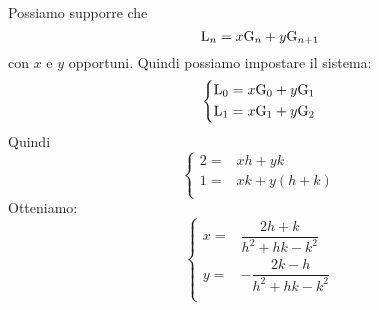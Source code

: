 Possiamo supporre che \begin{equation*}
	\mathrm{L}_{n}=x\mathrm{G}_{n}+y\mathrm{G}_{n+1}
\end{equation*}
con $x$ e $y$ opportuni. Quindi possiamo impostare il sistema:
\begin{equation*}
	\left\{
	\begin{aligned}
		\mathrm{L}_{0}={}&x\mathrm{G}_{0}+y\mathrm{G}_{1}\\
		\mathrm{L}_{1}={}&x\mathrm{G}_{1}+y\mathrm{G}_{2}\\
	\end{aligned}
	\right.
\end{equation*}
Quindi
\begin{equation*}
	\left\{
	\begin{aligned}
		2={}&xh+yk\\
		1={}&xk+y(h+k)\\
	\end{aligned}
	\right.
\end{equation*}
Otteniamo:
\begin{equation*}
	\left\{
	\begin{aligned}
		x={}&\dfrac{2h+k}{h^2+hk-k^2}\\
		y={}&-\dfrac{2k-h}{h^2+hk-k^2}\\
	\end{aligned}
	\right.
\end{equation*}

